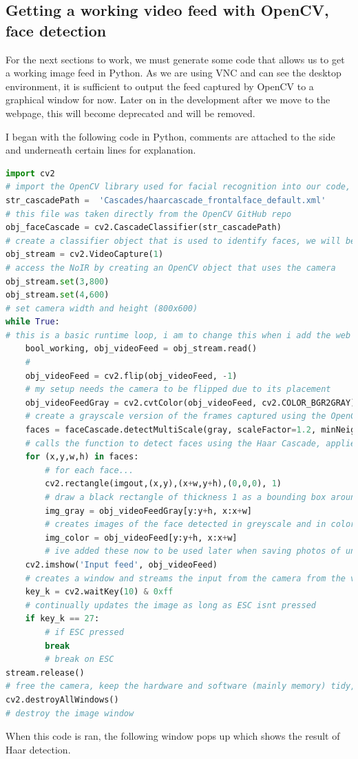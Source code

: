 \documentclass[9pt]{article}
\begin{document}
\newpage
\subsection{Getting a working video feed with OpenCV, face detection}
For the next sections to work, we must generate some code that allows us to get a working image feed in Python. As we are using VNC and can see the desktop environment, it is sufficient to output the feed captured by OpenCV to a graphical window for now. Later on in the development after we move to the webpage, this will become deprecated and will be removed.

I began with the following code in Python, comments are attached to the side and underneath certain lines for explanation.
\begin{lstlisting}[language=Python]
import cv2 
# import the OpenCV library used for facial recognition into our code, we can then call all functions in this library
str_cascadePath =  'Cascades/haarcascade_frontalface_default.xml'
# this file was taken directly from the OpenCV GitHub repo
obj_faceCascade = cv2.CascadeClassifier(str_cascadePath) 
# create a classifier object that is used to identify faces, we will be using the cascade that str_cascadePath points to
obj_stream = cv2.VideoCapture(1) 
# access the NoIR by creating an OpenCV object that uses the camera
obj_stream.set(3,800) 
obj_stream.set(4,600)
# set camera width and height (800x600)
while True: 
# this is a basic runtime loop, i am to change this when i add the web interface to call this as a function
	bool_working, obj_videoFeed = obj_stream.read() 
	# 
	obj_videoFeed = cv2.flip(obj_videoFeed, -1) 
	# my setup needs the camera to be flipped due to its placement
	obj_videoFeedGray = cv2.cvtColor(obj_videoFeed, cv2.COLOR_BGR2GRAY) 
	# create a grayscale version of the frames captured using the OpenCV conversion
	faces = faceCascade.detectMultiScale(gray, scaleFactor=1.2, minNeighbors=5, minSize=(30, 30)) 
	# calls the function to detect faces using the Haar Cascade, applied to the gray image
	for (x,y,w,h) in faces: 
		# for each face...
		cv2.rectangle(imgout,(x,y),(x+w,y+h),(0,0,0), 1) 
		# draw a black rectangle of thickness 1 as a bounding box around the face
		img_gray = obj_videoFeedGray[y:y+h, x:x+w] 
		# creates images of the face detected in greyscale and in color
		img_color = obj_videoFeed[y:y+h, x:x+w] 
		# ive added these now to be used later when saving photos of unknown people, just for testing at the moment
	cv2.imshow('Input feed', obj_videoFeed) 
	# creates a window and streams the input from the camera from the variable imgout
	key_k = cv2.waitKey(10) & 0xff 
	# continually updates the image as long as ESC isnt pressed
	if key_k == 27:
		# if ESC pressed
		break 
		# break on ESC
stream.release() 
# free the camera, keep the hardware and software (mainly memory) tidy, this prevents errors with the camera being in-use whilst we try to run the code
cv2.destroyAllWindows() 
# destroy the image window
\end{lstlisting}
When this code is ran, the following window pops up which shows the result of Haar detection.
\end{document}
